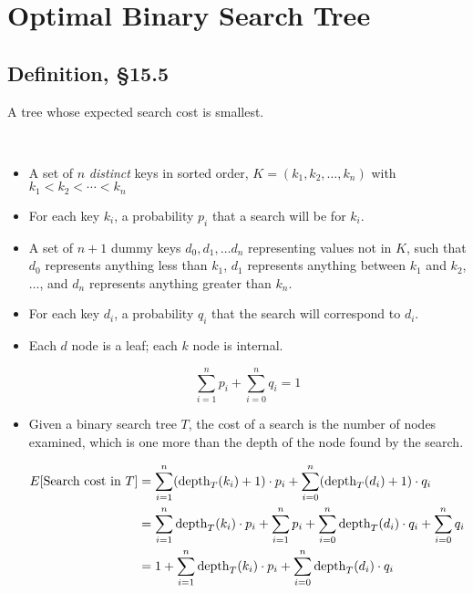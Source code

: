 \section{Optimal Binary Search Tree}


\subsection{Definition, \S 15.5}

A tree whose expected search cost is smallest.  

\

\begin{itemize}
	\item A set of $n$ {\it distinct} keys in sorted order, $K = (k_1, k_2, \dots, k_n)$ with $k_1 < k_2 < \cdots < k_n$
	\item For each key $k_i$, a probability $p_i$ that a search will be for $k_i$.  
	\item A set of $n+1$ dummy keys $d_0, d_1, \dots d_n$ representing values not in $K$, such that $d_0$ represents anything less than $k_1$, $d_1$ represents anything between $k_1$ and $k_2$, $\dots$, and $d_n$ represents anything greater than $k_n$.  
	\item For each key $d_i$, a probability $q_i$ that the search will correspond to $d_i$.  
	\item Each $d$ node is a leaf; each $k$ node is internal.  

$$\sum_{i=1}^n p_i + \sum_{i=0}^n q_i = 1$$

	\item Given a binary search tree $T$, the cost of a search is the number of nodes examined, which is one more than the depth of the node found by the search.
	
\begin{align*}
	E[\text{Search cost in $T$}] &= \sum_{i=1}^n (\text{depth}_T(k_i) + 1) \cdot p_i + \sum_{i=0}^n (\text{depth}_T(d_i) + 1) \cdot q_i \cr
	&= \sum_{i=1}^n \text{depth}_T(k_i) \cdot p_i + \sum_{i=1}^n p_i + \sum_{i=0}^n \text{depth}_T (d_i) \cdot q_i + \sum_{i=0}^n q_i \cr
	&= 1 + \sum_{i=1}^n \text{depth}_T(k_i) \cdot p_i + \sum_{i=0}^n \text{depth}_T (d_i) \cdot q_i\cr
	\cr
\end{align*}

\end{itemize}

